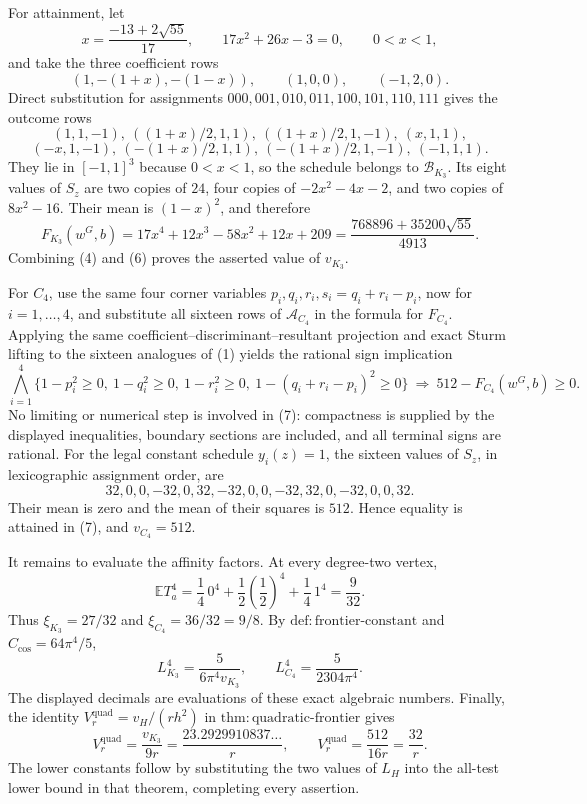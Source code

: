 For attainment, let
\[
x=\frac{-13+2\sqrt{55}}{17},\qquad 17x^2+26x-3=0,\qquad 0<x<1,
\]
and take the three coefficient rows
\[
(1,-(1+x),-(1-x)),\qquad (1,0,0),\qquad (-1,2,0).
\]
Direct substitution for assignments \(000,001,010,011,100,101,110,111\) gives the outcome rows
\[
 (1,1,-1),\ ((1+x)/2,1,1),\ ((1+x)/2,1,-1),\ (x,1,1),
\]
\[
 (-x,1,-1),\ (-(1+x)/2,1,1),\ (-(1+x)/2,1,-1),\ (-1,1,1).
\]
They lie in \([-1,1]^3\) because \(0<x<1\), so the schedule belongs to \(\mathcal B_{K_3}\).  Its eight values of \(S_z\) are two copies of \(24\), four copies of \(-2x^2-4x-2\), and two copies of \(8x^2-16\).  Their mean is \((1-x)^2\), and therefore
\[
F_{K_3}(w^G,b)=17x^4+12x^3-58x^2+12x+209
=\frac{768896+35200\sqrt{55}}{4913}. \tag{6}
\]
Combining (4) and (6) proves the asserted value of \(v_{K_3}\).

For \(C_4\), use the same four corner variables \(p_i,q_i,r_i,s_i=q_i+r_i-p_i\), now for \(i=1,\ldots,4\), and substitute all sixteen rows of \(\mathcal A_{C_4}\) in the formula for \(F_{C_4}\).  Applying the same coefficient--discriminant--resultant projection and exact Sturm lifting to the sixteen analogues of (1) yields the rational sign implication
\[
\bigwedge_{i=1}^4\{1-p_i^2\ge0,\ 1-q_i^2\ge0,\ 1-r_i^2\ge0,\ 1-(q_i+r_i-p_i)^2\ge0\}
\ \Longrightarrow\ 512-F_{C_4}(w^G,b)\ge0. \tag{7}
\]
No limiting or numerical step is involved in (7): compactness is supplied by the displayed inequalities, boundary sections are included, and all terminal signs are rational.  For the legal constant schedule \(y_i(z)=1\), the sixteen values of \(S_z\), in lexicographic assignment order, are
\[
32,0,0,-32,0,32,-32,0,0,-32,32,0,-32,0,0,32.
\]
Their mean is zero and the mean of their squares is \(512\).  Hence equality is attained in (7), and \(v_{C_4}=512\).

It remains to evaluate the affinity factors.  At every degree-two vertex,
\[
\mathbb E T_a^4=\frac14\,0^4+\frac12\left(\frac12\right)^4+\frac14\,1^4=\frac9{32}.
\]
Thus \(\xi_{K_3}=27/32\) and \(\xi_{C_4}=36/32=9/8\).  By \(\mathrm{def:frontier\text{-}constant}\) and \(C_{\cos}=64\pi^4/5\),
\[
L_{K_3}^4=\frac{5}{6\pi^4v_{K_3}},\qquad
L_{C_4}^4=\frac{5}{2304\pi^4}.
\]
The displayed decimals are evaluations of these exact algebraic numbers.  Finally, the identity \(V_r^{\mathrm{quad}}=v_H/(rh^2)\) in \(\mathrm{thm:quadratic\text{-}frontier}\) gives
\[
V_r^{\mathrm{quad}}=\frac{v_{K_3}}{9r}=\frac{23.2929910837\ldots}{r},\qquad
V_r^{\mathrm{quad}}=\frac{512}{16r}=\frac{32}{r}.
\]
The lower constants follow by substituting the two values of \(L_H\) into the all-test lower bound in that theorem, completing every assertion.

